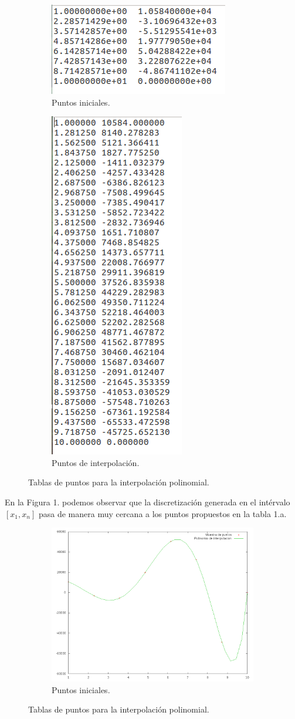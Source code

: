 \documentclass[12pt]{article}
\begin{document}
\begin{figure}[h!]
	\centering
	\begin{subfigure}{0.6\textwidth}
		\centering
		\includegraphics[width=.4\linewidth]{E1.png}
		\caption{Puntos iniciales.}
	\end{subfigure}%
	\begin{subfigure}{0.5\textwidth}
		\centering
		\includegraphics[width=.4\linewidth]{E2.png}
		\caption{Puntos de interpolación.}
	\end{subfigure}
	\caption{Tablas de puntos para la interpolación polinomial.}
\end{figure}

En la Figura 1. podemos observar que la discretización generada en el intérvalo $[x_1, x_n]$ pasa de manera muy cercana a los puntos propuestos en la tabla 1.a.\\

\begin{figure}[h!]
	\centering
	\begin{subfigure}{0.8\textwidth}
		\centering
		\includegraphics[width=.4\linewidth]{Grafica1.png}
		\caption{Puntos iniciales.}
	\end{subfigure}
	\caption{Tablas de puntos para la interpolación polinomial.}
\end{figure}
\end{document}
